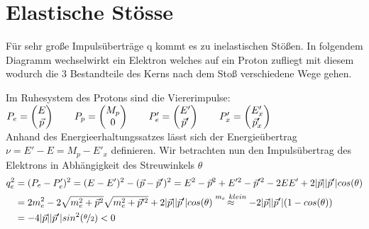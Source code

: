 \documentclass[Ex4_Zusammenfassung.tex]{subfiles}
\begin{document}
\section{Elastische Stösse}
Für sehr große Impulsüberträge q kommt es zu inelastischen Stößen. In folgendem Diagramm wechselwirkt ein Elektron welches auf ein Proton zufliegt mit diesem wodurch die 3 Bestandteile des Kerns nach dem Stoß verschiedene Wege gehen.
\begin{figure}[H]
\centering
{}
\end{figure} \newpage
Im Ruhesystem des Protons sind die Viererimpulse: \newline
$P_e = \begin{pmatrix} E\\ \vec p \end{pmatrix} \qquad P_p = \begin{pmatrix} M_p\\ 0 \end{pmatrix} \qquad P'_e = \begin{pmatrix} E'\\ \vec p' \end{pmatrix} \qquad P'_x = \begin{pmatrix} E'_x\\ \vec p'_x \end{pmatrix}$ \\ \newline
Anhand des Energieerhaltungssatzes lässt sich der \newline Energieübertrag $\nu = E'-E = M_p - E'_x$ definieren. \newline
Wir betrachten nun den Impulsübertrag des Elektrons in Abhängigkeit des Streuwinkels $\theta$
\begin{align*}
q_e^2 &= (P_e-P'_e)^2 = (E-E')^2 - (\vec p - \vec p')^2 = E^2 - \vec p^2 + E'^2 - \vec p'^2 - 2EE'+ 2|\vec p| |\vec p'| cos(\theta) \\ 
 &= 2 m_e^2 - 2 \sqrt{m_e^2 + \vec p^2} \sqrt{m_e^2 + \vec p'^2} + 2|\vec p| |\vec p'| cos(\theta) \stackrel{m_e \ klein}{\approx} -2 |\vec p| |\vec p'|(1-cos(\theta)) \\
 &= -4 |\vec p| |\vec p'| sin^2(\nicefrac{\theta}{2}) < 0
\end{align*}
\end{document}
